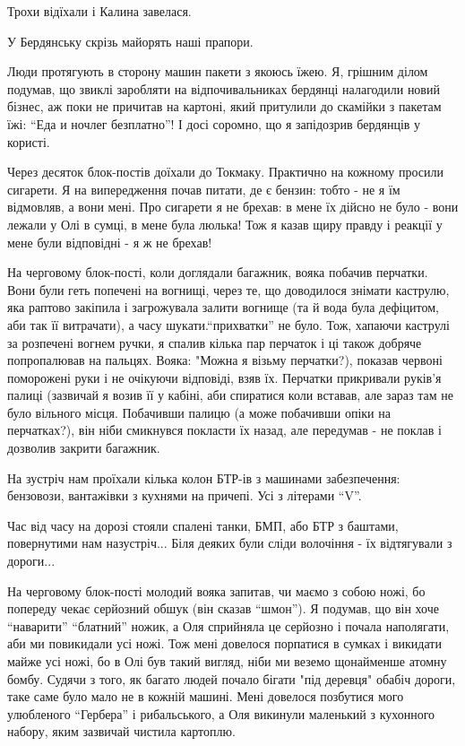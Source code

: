 Трохи відїхали і Калина завелася.

У Бердянську скрізь майорять наші прапори.

Люди протягують в сторону машин пакети з якоюсь їжею. Я, грішним ділом подумав,
що звиклі заробляти на відпочивальниках бердянці налагодили новий бізнес, аж
поки не причитав на картоні, який притулили до скамійки з пакетам їжі: \enquote{Еда и
ночлег безплатно}! І досі соромно, що я запідозрив бердянців у користі. 

Через десяток блок-постів доїхали до Токмаку. Практично на кожному просили
сигарети. Я на випередження почав питати, де є бензин: тобто - не я їм
відмовляв, а вони мені. Про сигарети я не брехав: в мене їх дійсно не було -
вони лежали у Олі в сумці, в мене була люлька! Тож я казав щиру правду і
реакції у мене були відповідні - я ж не брехав!

На черговому блок-пості, коли доглядали багажник, вояка побачив перчатки. Вони
були геть попечені на вогнищі, через те, що доводилося знімати каструлю, яка
раптово закіпила і загрожувала залити вогнище (та й вода була дефіцитом, аби
так її витрачати), а часу шукати.\enquote{прихватки} не було. Тож, хапаючи каструлі за
розпечені вогнем ручки, я спалив кілька пар перчаток і ці також добряче
попропалював на пальцях. Вояка: "Можна я візьму перчатки?),  показав червоні
поморожені руки і не очікуючи відповіді, взяв їх. Перчатки прикривали руків'я
палиці (зазвичай я возив її у кабіні, аби спиратися коли вставав, але зараз там
не було вільного місця. Побачивши палицю (а може побачивши опіки на
перчатках?), він ніби смикнувся покласти їх назад, але передумав - не поклав і
дозволив закрити багажник.

На зустріч нам проїхали кілька колон БТР-ів з машинами забезпечення:
бензовози, вантажівки з кухнями на причепі. Усі з літерами \enquote{V}.

Час від часу на дорозі стояли спалені танки,  БМП, або БТР з баштами,
повернутими нам назустріч... Біля деяких були сліди волочіння - їх відтягували
з дороги...

На черговому блок-пості молодий вояка запитав, чи маємо з собою ножі, бо
попереду чекає серйозний обшук (він сказав \enquote{шмон}). Я подумав, що він хоче
\enquote{наварити} \enquote{блатний} ножик, а Оля сприйняла це серйозно і почала наполягати,
аби ми повикидали усі ножі. Тож мені довелося порпатися в сумках і викидати
майже усі ножі, бо в Олі був такий вигляд, ніби ми веземо щонайменше атомну
бомбу. Судячи з того, як багато людей почало бігати "під деревця" обабіч
дороги, таке саме було мало не в кожній машині. Мені довелося позбутися мого
улюбленого \enquote{Гербера} і рибальського, а Оля викинули маленький з кухонного
набору, яким зазвичай  чистила картоплю. 

